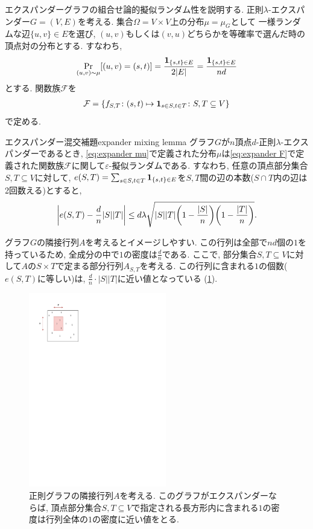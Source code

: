 エクスパンダーグラフの組合せ論的擬似ランダム性を説明する.
正則$\lambda$-エクスパンダー$G=(V,E)$を考える.
集合$\Omega=V\times V$上の分布$\mu = \mu_G$として
一様ランダムな辺$\{u,v\}\in E$を選び, $(u,v)$もしくは$(v,u)$どちらかを等確率で選んだ時の頂点対の分布とする.
すなわち,
\begin{align}
    \Pr_{(u,v)\sim \mu}\sbra*{ (u,v) = (s,t)} = \frac{\indicator{\{s,t\}\in E}}{2\abs{E}} = \frac{\indicator{\{s,t\}\in E}}{nd} \label{eq:expander mu}
\end{align}
とする.
関数族$\mathcal{F}$を
\begin{align}
    \mathcal{F} = \cbra*{ f_{S,T} \colon (s,t) \mapsto \indicator{s\in S,t\in T} \colon S,T\subseteq V}  \label{eq:expander F}
\end{align}
で定める.
%
\begin{lemma}{エクスパンダー混交補題}{expander mixing lemma}
    グラフ$G$が$n$頂点$d$-正則$\lambda$-エクスパンダーであるとき, \cref{eq:expander mu}で定義された分布$\mu$は\cref{eq:expander F}で定義された関数族$\mathcal{F}$に関して$\varepsilon$-擬似ランダムである.
    すなわち, 任意の頂点部分集合$S,T\subseteq V$に対して,
    $e(S,T) = \sum_{s\in S,t\in T} \indicator{\{s,t\} \in E}$を$S,T$間の辺の本数($S\cap T$内の辺は2回数える)とすると,
    \[
        \abs*{e(S,T) - \frac{d}{n}|S||T|} \le d\lambda\sqrt{|S||T|\rbra*{1-\frac{|S|}{n}}\rbra*{1-\frac{|T|}{n}}}.
    \]
\end{lemma}
%
グラフ$G$の隣接行列$A$を考えるとイメージしやすい.
この行列は全部で$nd$個の$1$を持っているため, 全成分の中で$1$の密度は$\frac{d}{n}$である.
ここで, 部分集合$S,T\subseteq V$に対して$A$の$S\times T$で定まる部分行列$A_{S,T}$を考える.
この行列に含まれる$1$の個数($e(S,T)$に等しい)は, $\frac{d}{n}\cdot |S||T|$に近い値となっている (\cref{fig:EML}).
\begin{figure}[htbp]
    \begin{center}
        \includegraphics[width=6cm]{images/EML.pdf}
        \caption{正則グラフの隣接行列$A$を考える. このグラフがエクスパンダーならば, 頂点部分集合$S,T\subseteq V$で指定される長方形内に含まれる$1$の密度は行列全体の$1$の密度に近い値をとる. \label{fig:EML}}
    \end{center}
\end{figure}

